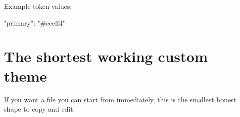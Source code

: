 Example token values:

\begin{CodeBlock}
"primary": "#eceff4"
\end{CodeBlock}


\section{The shortest working custom theme}\label{record-026-the-shortest-working-custom-theme}

If you want a file you can start from immediately, this is the smallest honest shape to copy and edit.

